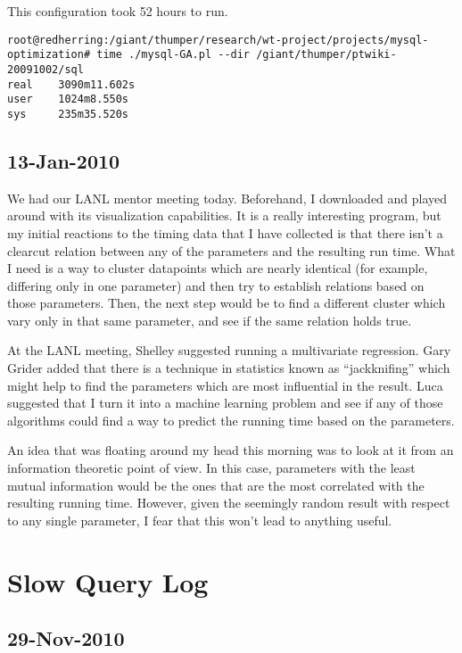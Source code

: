 This configuration took 52 hours to run.
\begin{verbatim}
root@redherring:/giant/thumper/research/wt-project/projects/mysql-optimization# time ./mysql-GA.pl --dir /giant/thumper/ptwiki-20091002/sql
real    3090m11.602s
user    1024m8.550s
sys     235m35.520s
\end{verbatim}

\subsection{13-Jan-2010}

We had our LANL mentor meeting today.
Beforehand, I downloaded  and played around with
its visualization capabilities.
It is a really interesting program, but my initial reactions to the
\mysql timing data that I have collected is that there isn't a clearcut
relation between any of the parameters and the resulting run time.
What I need is a way to cluster datapoints which are nearly identical
(for example, differing only in one parameter) and then try to establish
relations based on those parameters.
Then, the next step would be to find a different cluster which vary
only in that same parameter, and see if the same relation holds true.

At the LANL meeting, Shelley suggested running a multivariate
regression.
Gary Grider added that there is a technique in statistics known
as ``jackknifing'' which might help to find the parameters
which are most influential in the result.
Luca suggested that I turn it into a machine learning problem
and see if any of those algorithms could find a way to predict
the running time based on the parameters.

An idea that was floating around my head this morning was to look
at it from an information theoretic point of view.
In this case, parameters with the least mutual information would be the
ones that are the most correlated with the resulting running time.
However, given the seemingly random result with respect to any
single parameter, I fear that this won't lead to anything useful.


\section{Slow Query Log}

\subsection{29-Nov-2010}

